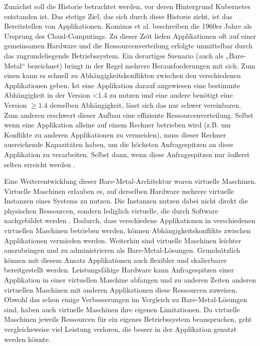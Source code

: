 \documentclass[11pt,a4paper]{article}
\begin{document}
Zunächst soll die Historie betrachtet werden, vor deren Hintergrund Kubernetes entstanden ist.
Das stetige Ziel, das sich durch diese Historie zieht, ist das Bereitstellen von Applikationen.
Kominos et al. \cite{7899247} beschreiben die 1960er Jahre als Ursprung des Cloud-Computings.
Zu dieser Zeit liefen Applikationen oft auf einer gemeinsamen Hardware und die Ressourcenverteilung erfolgte unmittelbar durch das zugrundeliegende Betriebssystem.
Ein derartiges Szenario (auch als „Bare-Metal“ bezeichnet) bringt in der Regel mehrere Herausforderungen mit sich.
Zum einen kann es schnell zu Abhängigkeitskonflikten zwischen den verschiedenen Applikationen geben.
Ist eine Applikation darauf angewiesen eine bestimmte Abhängigkeit in der Version <1.4 zu nutzen und eine andere
benötigt eine Version \(\geq 1.4\) derselben Abhängigkeit, lässt sich das nur schwer vereinbaren.
Zum anderen erschwert dieser Aufbau eine effiziente Ressourcenverteilung. Selbst wenn eine Applikation alleine auf einem Rechner betrieben wird (z.B. um Konflikte zu anderen
Applikationen zu vermeiden), muss dieser Rechner ausreichende Kapazitäten haben, um die höchsten Anfragespitzen an diese Applikation zu verarbeiten.
Selbst dann, wenn diese Anfragespitzen nur äußerst selten erreicht werden \cite{Pagani_2019}.

Eine Weiterentwicklung dieser Bare-Metal-Architektur waren virtuelle Maschinen. Virtuelle Maschinen erlauben es, auf derselben Hardware mehrere virtuelle Instanzen eines
Systems zu nutzen. Die Instanzen nutzen dabei nicht direkt die physischen Ressourcen, sondern lediglich virtuelle, die durch Software nachgebildet werden \cite{kofler2021docker}.
Dadurch, dass verschiedene Applikationen in verschiedenen virtuellen Maschinen betrieben werden, können Abhängigkeitskonflikte zwischen Applikationen
vermieden werden. Weiterhin sind virtuelle Maschinen leichter auszubringen und zu administrieren als Bare-Metal-Lösungen.
Grundsätzlich können mit diesem Ansatz Applikationen auch flexibler und skalierbarer bereitgestellt werden.
Leistungsfähige Hardware kann Anfragespitzen einer Applikation in einer virtuellen Maschine abfangen und zu anderen Zeiten anderen virtuellen Maschinen mit anderen
Applikationen diese Ressourcen zuweisen.
Obwohl das schon einige Verbesserungen im Vergleich zu Bare-Metal-Lösungen sind, haben auch virtuelle Maschinen ihre eigenen Limitationen.
Da virtuelle Maschinen jeweils Ressourcen für ein eigenes Betriebssystem beanspruchen, geht vergleichsweise viel Leistung verloren, 
die besser in der Applikation genutzt werden könnte.
\end{document}
